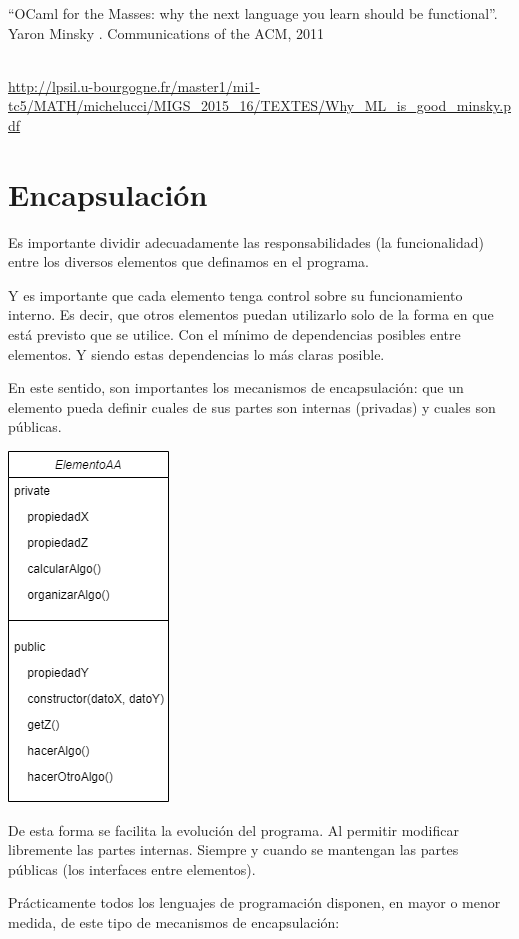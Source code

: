 \documentclass[spanish,12pt,a4paper,final,oneside]{book}
\begin{document}
``OCaml for the Masses: why the next language you learn should be functional''. Yaron Minsky . Communications of the ACM, 2011
\begin{tiny}
\\ \url{http://lpsil.u-bourgogne.fr/master1/mi1-tc5/MATH/michelucci/MIGS_2015_16/TEXTES/Why_ML_is_good_minsky.pdf}
\end{tiny}


\section{Encapsulación}

Es importante dividir adecuadamente las responsabilidades (la funcionalidad) entre los diversos elementos que definamos en el programa.

Y es importante que cada elemento tenga control sobre su funcionamiento interno. Es decir, que otros elementos puedan utilizarlo solo de la forma en que está previsto que se utilice. Con el mínimo de dependencias posibles entre elementos. Y siendo estas dependencias lo más claras posible.

En este sentido, son importantes los mecanismos de encapsulación: que un elemento pueda definir cuales de sus partes son internas (privadas) y cuales son públicas.

\includegraphics[scale=0.8]{encapsulacion}

De esta forma se facilita la evolución del programa. Al permitir modificar libremente las partes internas. Siempre y cuando se mantengan las partes públicas (los interfaces entre elementos).

\newpage
Prácticamente todos los lenguajes de programación disponen, en mayor o menor medida, de  este tipo de mecanismos de encapsulación:
\end{document}
